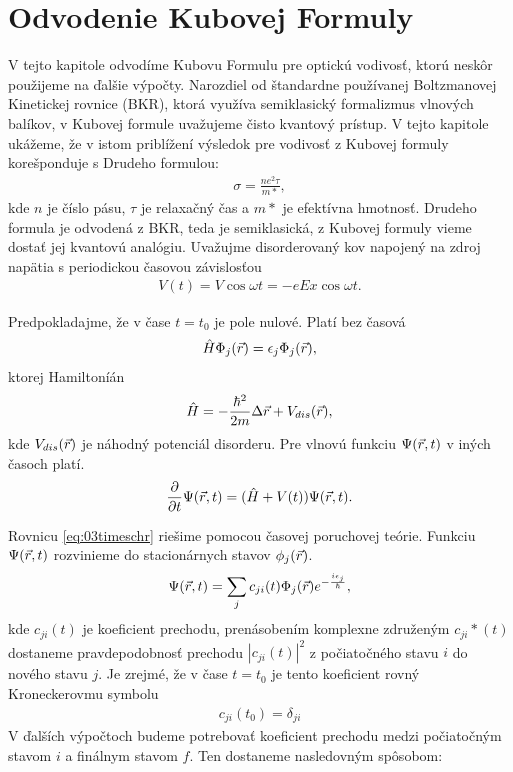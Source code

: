 \section{Odvodenie Kubovej Formuly}
\label{sec:kubo}
V tejto kapitole odvodíme Kubovu Formulu pre optickú vodivosť, ktorú neskôr použijeme na ďalšie výpočty.
Narozdiel od štandardne používanej Boltzmanovej Kinetickej rovnice (BKR), ktorá využíva semiklasický 
formalizmus vlnových balíkov, v Kubovej formule uvažujeme čisto kvantový prístup. V tejto kapitole 
ukážeme, že v istom priblížení výsledok pre vodivosť z Kubovej formuly korešponduje s Drudeho formulou:
\begin{align}
\label{eq:03drude}
\sigma=\frac{ne^2\tau}{m*}\mathrm{,}
\end{align}
kde $n$ je číslo pásu, $\tau$ je relaxačný čas a $m*$ je efektívna hmotnosť. Drudeho formula je odvodená z 
BKR, teda je semiklasická, z Kubovej formuly vieme dostať jej kvantovú analógiu.
Uvažujme disorderovaný kov napojený na zdroj napätia s periodickou časovou závislosťou
\begin{align}
\label{eq:03potential}
V(t)=V\cos \omega t = -eEx \cos \omega t \mathrm{.}
\end{align}

Predpokladajme, že v čase $t=t_0$ je pole nulové. Platí bez časová \schr
\begin{align}
\label{eq:03schr}
\hat{H} \Phi_j(\vec{r})= \epsilon_j\Phi_j(\vec{r}) \mathrm{,}
\end{align}
ktorej Hamiltoníán
\begin{align}
\label{eq:03Hamiltonian}
\hat{H}= - \frac{\hbar^2}{2m}\Delta \vec{r} + V_{dis}(\vec{r}) \mathrm{,} 
\end{align}
kde $V_{dis}(\vec{r})$ je náhodný potenciál disorderu. Pre vlnovú funkciu $\Psi(\vec{r},t)$ v iných časoch platí. 
\begin{align}
\label{eq:03timeschr}
\frac{\partial}{\partial t} \Psi(\vec{r},t) = (\hat{H} + V(t))\Psi(\vec{r},t)\mathrm{.}
\end{align}

Rovnicu \eqref{eq:03timeschr}  riešime pomocou časovej poruchovej teórie. Funkciu $\Psi(\vec{r},t)$ rozvinieme do stacionárnych stavov $\phi_j(\vec{r})$. 
\begin{align}
\label{eq:03stac}
\Psi(\vec{r},t)=\sum_j c_{ji}(t)\Phi_j(\vec{r})e^{-\frac{i\epsilon_j}{\hbar}} \mathrm{,}
\end{align}
kde $c_{ji}(t)$ je koeficient prechodu, prenásobením komplexne združeným   $c_{ji}*(t)$ dostaneme pravdepodobnosť prechodu $|c_{ji}(t)|^2$ z počiatočného stavu $i$ do nového stavu $j$. Je zrejmé, že v čase $t=t_0$ je tento koeficient rovný Kroneckerovmu symbolu
\begin{align}
\label{eq:03cji0}
c_{ji}(t_0)=\delta_{ji}
\end{align}  
V ďalších výpočtoch budeme potrebovať koeficient prechodu medzi počiatočným stavom $i$  a finálnym stavom $f$. Ten dostaneme nasledovným spôsobom:

